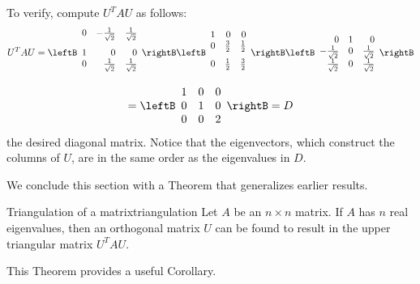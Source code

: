 \begin{solution}
To verify, compute $U^{T}AU$ as follows:
\begin{equation*}
U^{T}AU = 
\leftB
\begin{array}{rrr}
0 & -\vspace{0.05in}\frac{1}{\sqrt{2}} & \vspace{0.05in}\frac{1}{\sqrt{2}}
\\ 
1 & 0 & 0 \\ 
0 & \vspace{0.05in}\frac{1}{\sqrt{2}} & \vspace{0.05in}\frac{1}{\sqrt{2}}
\end{array}
\rightB \leftB
\begin{array}{rrr}
1 & 0 & 0 \\ 
0 & \vspace{0.05in}\frac{3}{2} & \vspace{0.05in}\frac{1}{2} \\ 
0 & \vspace{0.05in}\frac{1}{2} & \vspace{0.05in}\frac{3}{2}
\end{array}
\rightB \leftB 
\begin{array}{rrr}
0 & 1 & 0 \\ 
-\frac{1}{\sqrt{2}} & 0 & \frac{1}{\sqrt{2}} \\ 
\frac{1}{\sqrt{2}} & 0 & \frac{1}{\sqrt{2}}
\end{array}
\rightB
\end{equation*}
\begin{equation*}
=\leftB
\begin{array}{rrr}
1 & 0 & 0 \\ 
0 & 1 & 0 \\ 
0 & 0 & 2
\end{array}
\rightB = D 
\end{equation*}
the desired diagonal matrix. Notice that the eigenvectors, which construct the columns of $U$, are in the same order as the eigenvalues in $D$. 
\end{solution}

We conclude this section with a Theorem that generalizes earlier results.

\begin{theorem}{Triangulation of a matrix}{triangulation}
Let $A$ be an $n \times n$ matrix. If $A$ has $n$ real eigenvalues, then an orthogonal matrix $U$ can be found to result in the upper triangular matrix $U^T A U$. 
\end{theorem}

This Theorem provides a useful Corollary.


